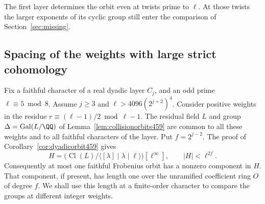 \documentclass[a4paper,11pt]{article}
\theoremstyle{definition}
\theoremstyle{remark}
\numberwithin{equation}{section}
\newcommand{\Cl}{\operatorname{Cl}}
\begin{document}
The first layer determines the orbit even at twists prime to
\(\ell\). At those twists the larger exponents of its cyclic
group still enter the comparison of Section~\ref{sec:missing}.


\subsection{Spacing of the weights with large strict cohomology}
\label{sec:spacingdyadic464}

Fix a faithful character of a real dyadic layer \(C_j\), and an odd
prime \(\ell\equiv5\bmod 8\). Assume \(j\ge3\) and
\(\ell>4096(2^{j+2})^4\). Consider positive weights in the residue
\(r\equiv(\ell-1)/2\bmod{\ell-1}\). The residual field \(L\) and
group \(\Delta=\operatorname{Gal}(L/\QQ)\) of
Lemma~\ref{lem:collisionorbits459} are common to all these weights
and to all faithful characters of the layer. Put \(f=2^{j-2}\).
The proof of Corollary~\ref{cor:dyadicorbit459} gives
\[
 H=\bigl(\Cl(L)/\langle[\lambda]\mid\lambda\mid\ell\rangle\bigr)
                [\ell^\infty],\qquad |H|<\ell^{2f}.
\]
Consequently at most one faithful Frobenius orbit has a nonzero
component in \(H\). That component, if present, has length one over
the unramified coefficient ring \(O\) of degree \(f\). We shall
use this length at a finite-order character to compare the groups
at different integer weights.
\end{document}

